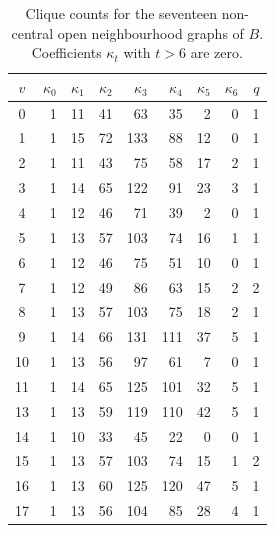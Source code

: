 \begin{table}[H]
\centering\small\setlength{\tabcolsep}{4pt}
\caption{Clique counts for the seventeen non-central open neighbourhood graphs of \(B\). Coefficients \(\kappa_t\) with \(t>6\) are zero.}\label{6k6:tab:Bq}
\begin{tabular}{c r r r r r r r r}
\toprule
$v$ & $\kappa_0$ & $\kappa_1$ & $\kappa_2$ & $\kappa_3$ & $\kappa_4$ & $\kappa_5$ & $\kappa_6$ & $q$\\
\midrule

0 & 1 & 11 & 41 & 63 & 35 & 2 & 0 & 1\\
1 & 1 & 15 & 72 & 133 & 88 & 12 & 0 & 1\\
2 & 1 & 11 & 43 & 75 & 58 & 17 & 2 & 1\\
3 & 1 & 14 & 65 & 122 & 91 & 23 & 3 & 1\\
4 & 1 & 12 & 46 & 71 & 39 & 2 & 0 & 1\\
5 & 1 & 13 & 57 & 103 & 74 & 16 & 1 & 1\\
6 & 1 & 12 & 46 & 75 & 51 & 10 & 0 & 1\\
7 & 1 & 12 & 49 & 86 & 63 & 15 & 2 & 2\\
8 & 1 & 13 & 57 & 103 & 75 & 18 & 2 & 1\\
9 & 1 & 14 & 66 & 131 & 111 & 37 & 5 & 1\\
10 & 1 & 13 & 56 & 97 & 61 & 7 & 0 & 1\\
11 & 1 & 14 & 65 & 125 & 101 & 32 & 5 & 1\\
13 & 1 & 13 & 59 & 119 & 110 & 42 & 5 & 1\\
14 & 1 & 10 & 33 & 45 & 22 & 0 & 0 & 1\\
15 & 1 & 13 & 57 & 103 & 74 & 15 & 1 & 2\\
16 & 1 & 13 & 60 & 125 & 120 & 47 & 5 & 1\\
17 & 1 & 13 & 56 & 104 & 85 & 28 & 4 & 1\\
\bottomrule
\end{tabular}
\end{table}
